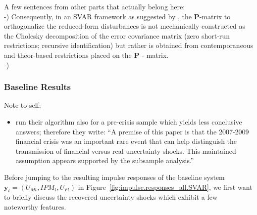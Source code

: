 \documentclass[a4paper,11pt,listof=nochaptergap,oneside,pointednumbers,bibtotoc,bigheadings,liststotoc]{scrbook}
\theoremstyle{mysatz}
\theoremstyle{mydefinition}
\theoremstyle{mybemerkung}
\renewcommand*{\paragraph}[1]{\subsubsection*{#1} \vspace{-3mm}} %
\newcommand{\vect}[1]{\boldsymbol{\mathbf{#1}}}
\begin{document}
A few sentences from other parts that actually belong here:\\
-) Consequently, in an SVAR framework as suggested by \citet{ludvigsonetal:18}, the $\vect{P}$-matrix to orthogonalize the reduced-form disturbances is not mechanically constructed as the Cholesky decomposition of the error covariance matrix (zero short-run restrictions; recursive identification) but rather is obtained from contemporaneous and theor-based restrictions placed on the $\vect{P}$ - matrix.\\
-) 

\paragraph{Baseline Results}

\begingroup
    \fontsize{8pt}{12pt}\selectfont
    Note to self:
\begin{itemize}
	\item \citet[p. 25]{ludvigsonetal:18} run their algorithm also for a pre-crisis sample which yields less conclusive answers; therefore they write: ``A premise of this paper is that the 2007-2009 financial crisis was an important rare event that can help distinguish the transmission of financial versus real uncertainty shocks. This maintained assumption appears supported by the subsample analysis.''
\end{itemize}
\endgroup

Before jumping to the resulting impulse responses of the baseline system $\vect{y}_t = (U_{Mt}, IPM_{t}, U_{Ft})$ in Figure~\ref{fig:impulse.responses_all.SVAR}, we first want to briefly discuss the recovered uncertainty shocks which exhibit a few noteworthy features. \\
\\
\end{document}
